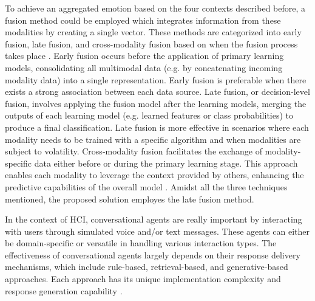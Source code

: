 \documentclass[runningheads]{llncs}
\begin{document}
To achieve an aggregated emotion based on the four contexts described before, a fusion method could be employed which integrates information from these modalities by creating a single vector. These methods are categorized into early fusion, late fusion, and cross-modality fusion based on when the fusion process takes place \cite{sleeman_multimodal_2022, zhu_multimodal_2023}. Early fusion occurs before the application of primary learning models, consolidating all multimodal data (e.g. by concatenating incoming modality data) into a single representation. Early fusion is preferable when there exists a strong association between each data source. Late fusion, or decision-level fusion, involves applying the fusion model after the learning models, merging the outputs of each learning model (e.g. learned features or class probabilities) to produce a final classification. Late fusion is more effective in scenarios where each modality needs to be trained with a specific algorithm and when modalities are subject to volatility. Cross-modality fusion facilitates the exchange of modality-specific data either before or during the primary learning stage. This approach enables each modality to leverage the context provided by others, enhancing the predictive capabilities of the overall model \cite{sleeman_multimodal_2022}. Amidst all the three techniques mentioned, the proposed solution employes the late fusion method.

In the context of HCI, conversational agents are really important by interacting with users through simulated voice and/or text messages. These agents can either be domain-specific or versatile in handling various interaction types. The effectiveness of conversational agents largely depends on their response delivery mechanisms, which include rule-based, retrieval-based, and generative-based approaches. Each approach has its unique implementation complexity and response generation capability \cite{fernandes_survey_2020, ramesh_survey_2017}.
\end{document}
